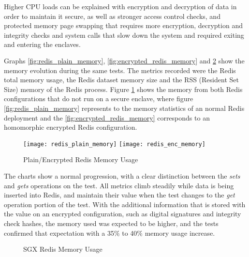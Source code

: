 Higher \gls{CPU} loads can be explained with encryption and decryption of data in order to maintain it secure, as well as stronger access control checks, and protected memory page swapping that requires more encryption, decryption and integrity checks and system calls that slow down the system and required exiting and entering the enclaves.

Graphs \ref{fig:redis_plain_memory}, \ref{fig:encrypted_redis_memory} and \ref{fig:redis_sgx_memory} show the memory evolution during the same tests. The metrics recorded were the Redis total memory usage, the Redis dataset memory size and the \gls{RSS} (Resident Set Size) memory of the Redis process. Figure \ref {fig:redis_plain_enc_memory_results} shows the memory from both Redis configurations that do not run on a secure enclave, where figure \ref{fig:redis_plain_memory} represents to the memory statistics of an normal Redis deployment and the  \ref{fig:encrypted_redis_memory} corresponds to an homomorphic encrypted Redis configuration.

\begin{figure}[htbp]
\hspace*{-8mm}
  \centering
    {\texttt{[image: redis\_plain\_memory]}}%
    {\texttt{[image: redis\_enc\_memory]}}%
  \caption{Plain/Encrypted Redis Memory Usage}
  \label{fig:redis_plain_enc_memory_results}
\end{figure}

The charts show a normal progression, with a clear distinction between the \textit{sets} and \textit{gets} operations on the test. All metrics climb steadily while data is being inserted into Redis, and maintain their value when the test changes to the \textit{get} operation portion of the test. With the additional information that is stored with the value on an encrypted configuration, such as digital signatures and integrity check hashes, the memory used was expected to be higher, and the tests confirmed that expectation with a 35\% to 40\% memory usage increase.

\begin{figure}[htbp]
  \caption{SGX Redis Memory Usage}
  \label{fig:redis_sgx_memory}
\end{figure}

